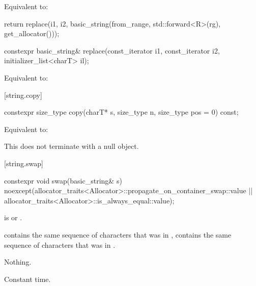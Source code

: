 \begin{itemdescr}
\pnum
\effects
Equivalent to:
\begin{codeblock}
return replace(i1, i2, basic_string(from_range, std::forward<R>(rg), get_allocator()));
\end{codeblock}
\end{itemdescr}

%
\begin{itemdecl}
constexpr basic_string& replace(const_iterator i1, const_iterator i2, initializer_list<charT> il);
\end{itemdecl}

\begin{itemdescr}
\pnum
\effects
Equivalent to: 
\end{itemdescr}

[string.copy]{}

%
\begin{itemdecl}
constexpr size_type copy(charT* s, size_type n, size_type pos = 0) const;
\end{itemdecl}

\begin{itemdescr}
\pnum
\effects
Equivalent to:
\begin{note}
This does not terminate  with a null object.
\end{note}
\end{itemdescr}

[string.swap]{}

%
\begin{itemdecl}
constexpr void swap(basic_string& s)
  noexcept(allocator_traits<Allocator>::propagate_on_container_swap::value ||
           allocator_traits<Allocator>::is_always_equal::value);
\end{itemdecl}

\begin{itemdescr}
\pnum
\expects
{} is 
or
.

\pnum
\ensures
{}
contains the same sequence of characters that was in ,
 contains the same sequence of characters that was in
.

\pnum
\throws
Nothing.

\pnum
\complexity
Constant time.
\end{itemdescr}


